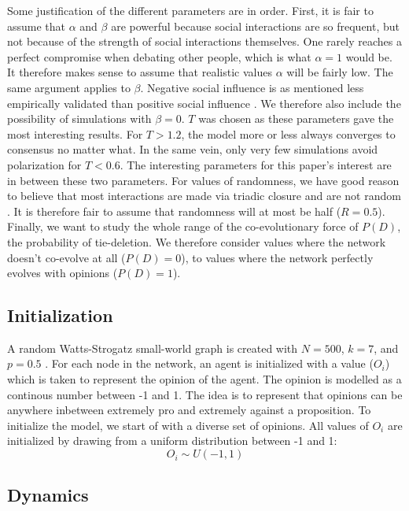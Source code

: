 \documentclass{article}
\begin{document}
Some justification of the different parameters are in order. 
First, it is fair to assume that $\alpha$ and $\beta$ are powerful because social interactions are so frequent, but not because of the strength of social interactions themselves.
One rarely reaches a perfect compromise when debating other people, which is what $\alpha = 1$ would be. It therefore makes sense to assume that realistic values $\alpha$ will be fairly low. 
The same argument applies to $\beta$. Negative social influence is as mentioned less empirically validated than positive social influence \cite{takacs_is_2014}. We therefore also include the possibility of simulations with $\beta = 0$. 
$T$ was chosen as these parameters gave the most interesting results. For $T > 1.2$, the model more or less always converges to consensus no matter what. In the same vein, only very few simulations avoid polarization for $T < 0.6$. The interesting parameters for this paper's interest are in between these two parameters. 
For values of randomness, we have good reason to believe that most interactions are made via triadic closure and are not random \cite{kossinets_origins_2009}. It is therefore fair to assume that randomness will at most be half ($R = 0.5$).
Finally, we want to study the whole range of the co-evolutionary force of $P(D)$, the probability of tie-deletion. We therefore consider values where the network doesn't co-evolve at all ($P(D) = 0$), to values where the network perfectly evolves with opinions ($P(D) = 1$).


\subsection{Initialization}
A random Watts-Strogatz small-world graph is created 
with $N=500$, $k=7$, and $p=0.5$ \cite{watts_collective_1998}. For each node in the network,
an agent is initialized with a value ($O_i$) which is taken to represent the opinion of the agent. The opinion is modelled as a continous number between -1 and 1. 
The idea is to represent that opinions can be anywhere inbetween extremely pro and extremely against a proposition.
To initialize the model, we start of with a diverse set of opinions. All values of $O_i$ are initialized by drawing from a uniform distribution between -1 and 1: 
$$O_i \sim U(-1, 1)$$

\subsection{Dynamics}
\end{document}

